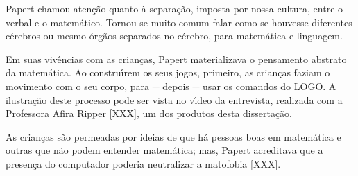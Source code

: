 \documentclass[
12pt,		%
openright,	%
twoside,  %
a4paper,			%
chapter=TITLE,		%
english,			%
french,				%
spanish,			%
brazil				%
]{USPSC-classe/USPSC}
\begin{document}
\noindent\begin{center}\mbox{\centering{}}\end{center}


Papert chamou aten\c{c}\~ao quanto \`a separa\c{c}\~ao, imposta por nossa cultura, entre o verbal e o matem\'atico. Tornou-se muito comum falar como se houvesse diferentes c\'erebros ou mesmo \'org\~aos separados no c\'erebro, para matem\'atica e linguagem.














Em suas viv\^encias com as crian\c{c}as, Papert materializava o pensamento abstrato da matem\'atica. Ao constru\'{\i}rem os seus jogos, primeiro, as crian\c{c}as faziam o movimento com o seu corpo, para ─ depois  ─ usar os comandos do LOGO. A ilustra\c{c}\~ao deste processo pode ser vista no v\'{\i}deo  da entrevista, realizada com a Professora Afira Ripper [XXX],  um dos produtos desta disserta\c{c}\~ao.














As crian\c{c}as s\~ao permeadas por ideias de que h\'a pessoas boas em matem\'atica e outras que n\~ao podem entender matem\'atica; mas, Papert acreditava que a presen\c{c}a do computador poderia neutralizar a matofobia [XXX].
\end{document}
